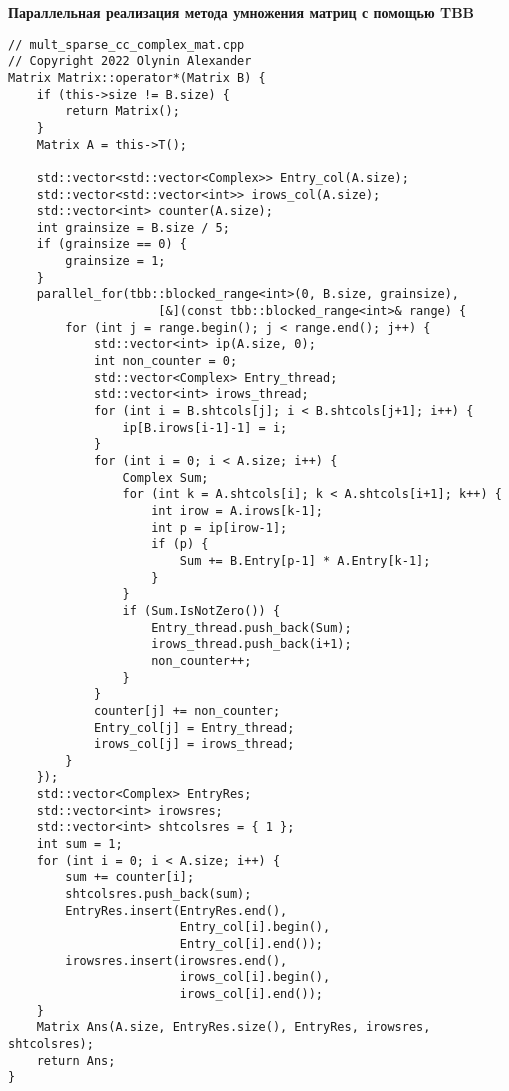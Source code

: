 \documentclass{report}
\begin{document}
\textbf{Параллельная реализация метода умножения матриц с помощью TBB}
\begin{lstlisting}
// mult_sparse_cc_complex_mat.cpp
// Copyright 2022 Olynin Alexander
Matrix Matrix::operator*(Matrix B) {
    if (this->size != B.size) {
        return Matrix();
    }
    Matrix A = this->T();

    std::vector<std::vector<Complex>> Entry_col(A.size);
    std::vector<std::vector<int>> irows_col(A.size);
    std::vector<int> counter(A.size);
    int grainsize = B.size / 5;
    if (grainsize == 0) {
        grainsize = 1;
    }
    parallel_for(tbb::blocked_range<int>(0, B.size, grainsize),
                     [&](const tbb::blocked_range<int>& range) {
        for (int j = range.begin(); j < range.end(); j++) {
            std::vector<int> ip(A.size, 0);
            int non_counter = 0;
            std::vector<Complex> Entry_thread;
            std::vector<int> irows_thread;
            for (int i = B.shtcols[j]; i < B.shtcols[j+1]; i++) {
                ip[B.irows[i-1]-1] = i;
            }
            for (int i = 0; i < A.size; i++) {
                Complex Sum;
                for (int k = A.shtcols[i]; k < A.shtcols[i+1]; k++) {
                    int irow = A.irows[k-1];
                    int p = ip[irow-1];
                    if (p) {
                        Sum += B.Entry[p-1] * A.Entry[k-1];
                    }
                }
                if (Sum.IsNotZero()) {
                    Entry_thread.push_back(Sum);
                    irows_thread.push_back(i+1);
                    non_counter++;
                }
            }
            counter[j] += non_counter;
            Entry_col[j] = Entry_thread;
            irows_col[j] = irows_thread;
        }
    });
    std::vector<Complex> EntryRes;
    std::vector<int> irowsres;
    std::vector<int> shtcolsres = { 1 };
    int sum = 1;
    for (int i = 0; i < A.size; i++) {
        sum += counter[i];
        shtcolsres.push_back(sum);
        EntryRes.insert(EntryRes.end(),
                        Entry_col[i].begin(),
                        Entry_col[i].end());
        irowsres.insert(irowsres.end(),
                        irows_col[i].begin(),
                        irows_col[i].end());
    }
    Matrix Ans(A.size, EntryRes.size(), EntryRes, irowsres, shtcolsres);
    return Ans;
}
\end{lstlisting}
\end{document}
